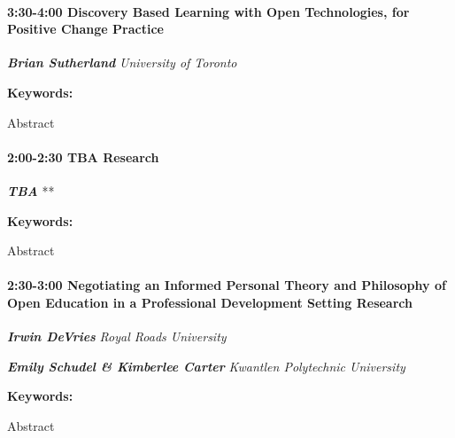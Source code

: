 \documentclass[
]{book}
\begin{document}
\begin{session}
\hypertarget{discovery-based-learning-with-open-technologies-for-positive-change-practice}{%
\paragraph*{\texorpdfstring{3:30-4:00 \textbar{} \textbf{Discovery Based
Learning with Open Technologies, for Positive Change} \textbar{}
Practice}{3:30-4:00 \textbar{} Discovery Based Learning with Open Technologies, for Positive Change \textbar{} Practice}}\label{discovery-based-learning-with-open-technologies-for-positive-change-practice}}

\textbf{\emph{Brian Sutherland}} \textbar{} \emph{University of Toronto}

\textbf{Keywords:}

Abstract
\end{session}

\begin{session}
\hypertarget{tba-research}{%
\paragraph*{\texorpdfstring{2:00-2:30 \textbar{} \textbf{TBA} \textbar{}
Research}{2:00-2:30 \textbar{} TBA \textbar{} Research}}\label{tba-research}}

\textbf{\emph{TBA}} \textbar{} **

\textbf{Keywords:}

Abstract
\end{session}

\begin{session}
\hypertarget{negotiating-an-informed-personal-theory-and-philosophy-of-open-education-in-a-professional-development-setting-research}{%
\paragraph*{\texorpdfstring{2:30-3:00 \textbar{} \textbf{Negotiating an
Informed Personal Theory and Philosophy of Open Education in a
Professional Development Setting} \textbar{}
Research}{2:30-3:00 \textbar{} Negotiating an Informed Personal Theory and Philosophy of Open Education in a Professional Development Setting \textbar{} Research}}\label{negotiating-an-informed-personal-theory-and-philosophy-of-open-education-in-a-professional-development-setting-research}}

\textbf{\emph{Irwin DeVries}} \textbar{} \emph{Royal Roads University}

\textbf{\emph{Emily Schudel \& Kimberlee Carter}} \textbar{}
\emph{Kwantlen Polytechnic University}

\textbf{Keywords:}

Abstract
\end{session}
\end{document}
